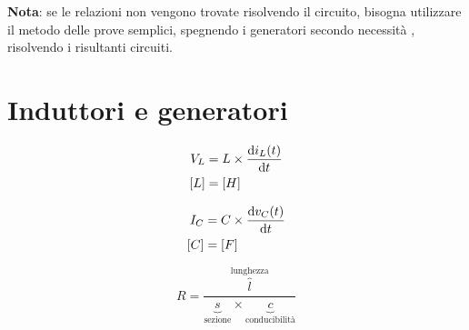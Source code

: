 \documentclass{article}
\begin{document}
        \medskip

        \textbf{Nota}: se le relazioni non vengono trovate risolvendo il circuito, bisogna utilizzare il metodo delle
        prove semplici, spegnendo i generatori secondo necessità , risolvendo i risultanti circuiti.

    \section*{Induttori e generatori}

        \begin{minipage}[t]{.03\textwidth}
            \vspace{-\baselineskip}
            
            

        \end{minipage}
        \hfill
        \begin{minipage}[t]{.2\textwidth}
            \vspace{-\baselineskip}
            
            \begin{align*}
                V_L &= L \times \dv{i_L (t)}{t}\\
                [L] &= [H]
            \end{align*}

        \end{minipage}
        \hfill
        \begin{minipage}[t]{.03\textwidth}
            \vspace{-\baselineskip}
            
            

        \end{minipage}
        \hfill
        \begin{minipage}[t]{.2\textwidth}
            \vspace{-\baselineskip}
            
            \begin{align*}
                I_C &= C \times \dv{v_C (t)}{t}\\
                [C] &= [F]
            \end{align*}

        \end{minipage}
        \hfill
        \begin{minipage}[t]{.2\textwidth}
            \vspace{-\baselineskip}
            
            \[
                R = \frac{\overbrace{l}^{\text{lunghezza}}}{\underbrace{s}_{\text{sezione}} \times \underbrace{c}_{\text{conducibilità}}}
            \]

        \end{minipage}
\end{document}
